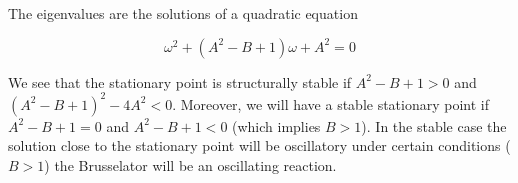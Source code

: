 The eigenvalues are the solutions of a quadratic equation \ie

\begin{equation}
  \omega^2 + (A^2 - B +1)\omega + A^2 = 0
\end{equation}

We see that the stationary point is structurally stable if $A^2 - B +
1>0$ and $(A^2-B+1)^2 - 4A^2 < 0$. Moreover, we will have a stable
stationary point if $A^2 - B + 1 = 0$ and $A^2 - B + 1 < 0$ (which
implies $B > 1$). In the stable case the solution close to the
stationary point will be oscillatory \ie under certain conditions
($B>1$) the Brusselator will be an oscillating reaction.
